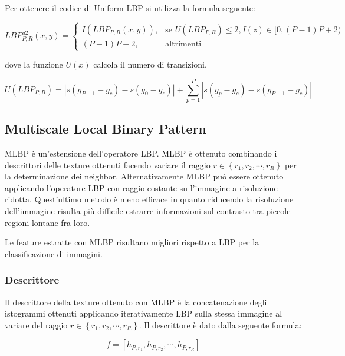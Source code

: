 Per ottenere il codice di Uniform \acs{LBP} si utilizza la formula seguente:

\begin{equation}
LBP_{P,R}^{u2}(x, y)=	
\begin{cases} 
I(LBP_{P,R}(x, y)), & \mbox{se } U(LBP_{P,R}) \le 2, I(z) \in [0, (P-1)P+2 )   \\
(P-1)P+2, & \mbox{altrimenti}
\end{cases}
\end{equation}

dove la funzione $U(x)$ calcola il numero di transizioni.

\begin{equation}
U(LBP_{P,R}) = |s( g_{P-1} - g_{c}) - s(g_{0} - g_{c}) | + \sum_{p = 1}^{P} |s(g_{p} - g_{c}) - s( g_{P-1} - g_{c}) |
\end{equation}

\subsection{Multiscale Local Binary Pattern}
\acf{MLBP} è un'estensione dell'operatore \acs{LBP}. \acs{MLBP} è ottenuto combinando i descrittori delle texture ottenuti facendo variare il raggio $r \in \left\lbrace  r_1, r_2, \cdots, r_R \right\rbrace$ per la determinazione dei neighbor. 
Alternativamente \acs{MLBP} può essere ottenuto applicando l'operatore \acs{LBP} con raggio costante su l'immagine a risoluzione ridotta. Quest'ultimo metodo è meno efficace in quanto riducendo la risoluzione dell'immagine risulta più difficile estrarre informazioni sul contrasto tra piccole regioni lontane fra loro.

Le feature estratte con \acs{MLBP} risultano migliori rispetto a \acs{LBP} per la classificazione di immagini.

\subsubsection{Descrittore}
\label{mlbp:desc-mlbp}
Il descrittore della texture ottenuto con \acs{MLBP} è la concatenazione degli istogrammi ottenuti applicando iterativamente \acs{LBP} sulla stessa immagine al variare del raggio $r \in \left\lbrace  r_1, r_2, \cdots, r_R \right\rbrace$. Il descrittore è dato dalla seguente formula:

\begin{equation}
\label{mlbp:eq-descriptor}
f = [h_{P, r_{1}}, h_{P, r_{2}}, \cdots, h_{P, r_R}]
\end{equation}

